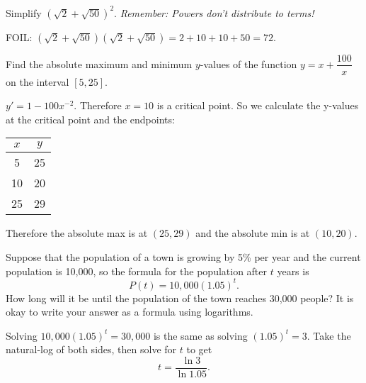 \documentclass[12pt,answers]{exam}
\begin{document}
\begin{questions}
\vfill


\question Simplify $(\sqrt{2} + \sqrt{50})^2$. \textit{Remember: Powers don't distribute to terms!}
\begin{solution}
FOIL: $(\sqrt{2} + \sqrt{50})(\sqrt{2} + \sqrt{50}) = 2 + 10 + 10 + 50 = 72$. 
\end{solution}
\vfill

\question Find the absolute maximum and minimum $y$-values of the function $y = x + \dfrac{100}{x}$ on the interval $[5,25]$.  
\begin{solution}
$y' = 1 - 100 x^{-2}$. Therefore $x = 10$ is a critical point.  So we calculate the y-values at the critical point and the endpoints:

\begin{tabular}{c|c}
$x$ & $y$ \\ \hline
5 & 25 \\
10 & 20 \\ 
25 & 29 
\end{tabular}

Therefore the absolute max is at $(25, 29)$ and the absolute min is at $(10,20)$.
\end{solution}
\vfill

\newpage

\question Suppose that the population of a town is growing by 5\% per year and the current population is 10{,}000, so the formula for the population after $t$ years is 
$$P(t) = 10{,}000 (1.05)^t.$$  
How long will it be until the population of the town reaches 30,000 people?  It is okay to write your answer as a formula using logarithms. 
\begin{solution}
Solving $10{,}000(1.05)^t = 30{,}000$ is the same as solving $(1.05)^t = 3$.  Take the natural-log of both sides, then solve for $t$ to get 
$$t = \dfrac{\ln 3}{\ln 1.05}.$$
\end{solution}
\vfill


\end{questions}
\end{document}
